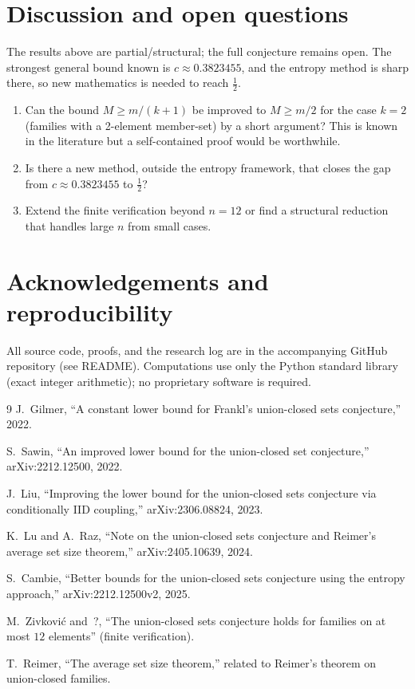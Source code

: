 \documentclass[11pt]{article}
\theoremstyle{definition}
\theoremstyle{remark}
\newcommand{\Nhalf}{\tfrac{1}{2}}
\begin{document}
\section{Discussion and open questions}

The results above are partial/structural; the full conjecture remains open.
The strongest general bound known is $c\approx0.3823455$, and the entropy
method is sharp there, so new mathematics is needed to reach $\Nhalf$.

\begin{enumerate}
\item Can the bound $M\ge m/(k+1)$ be improved to $M\ge m/2$ for the case
  $k=2$ (families with a 2-element member-set) by a short argument? This is
  known in the literature but a self-contained proof would be worthwhile.
\item Is there a new method, outside the entropy framework, that closes the
  gap from $c\approx0.3823455$ to $\Nhalf$?
\item Extend the finite verification beyond $n=12$ or find a structural
  reduction that handles large $n$ from small cases.
\end{enumerate}

\section*{Acknowledgements and reproducibility}

All source code, proofs, and the research log are in the accompanying GitHub
repository (see README). Computations use only the Python standard library
(exact integer arithmetic); no proprietary software is required.

\begin{thebibliography}{9}
J.~Gilmer, ``A constant lower bound for Frankl's union-closed sets
conjecture,'' 2022.

S.~Sawin, ``An improved lower bound for the union-closed set conjecture,''
arXiv:2212.12500, 2022.

J.~Liu, ``Improving the lower bound for the union-closed sets conjecture via
conditionally IID coupling,'' arXiv:2306.08824, 2023.

K.~Lu and A.~Raz, ``Note on the union-closed sets conjecture and Reimer's
average set size theorem,'' arXiv:2405.10639, 2024.

S.~Cambie, ``Better bounds for the union-closed sets conjecture using the
entropy approach,'' arXiv:2212.12500v2, 2025.

M.~Zivkovi\'c and~?, ``The union-closed sets conjecture holds for families on
at most $12$ elements'' (finite verification).

T.~Reimer, ``The average set size theorem,'' related to Reimer's theorem on
union-closed families.
\end{thebibliography}
\end{document}
